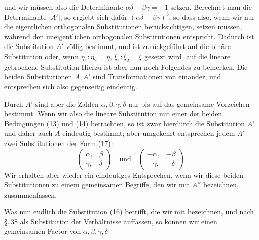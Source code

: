 und wir müssen also die Determinante $\alpha\delta - \beta\gamma = \pm 1$
setzen. Berechnet man die Determinante $|A'|$, so ergiebt sich
dafür $(\alpha\delta - \beta\gamma)^3$, so dass also, wenn wir nur
die eigentlichen orthogonalen Substitutionen berücksichtigen,
setzen müssen, während
den uneigentlichen orthogonalen Substitutionen entspricht.
Dadurch ist die Substitution $A'$ völlig bestimmt, und ist
zurückgeführt auf die binäre Substitution
oder, wenn $\eta_1 : \eta_2 = \eta$, $\xi_1 : \xi_2 = \xi$ gesetzt
wird, auf die lineare gebrochene Substitution
Hierzu ist aber nun noch Folgendes zu bemerken. Die beiden
Substitutionen $A, A'$ sind Transformationen von einander, und
entsprechen sich also gegenseitig eindeutig.

Durch $A'$ sind aber die Zahlen $\alpha, \beta, \gamma, \delta$
nur bis auf das gemeinsame Vorzeichen bestimmt. Wenn wir also die
lineare Substitution
mit einer der beiden Bedingungen (13) und (14) betrachten, so ist
zwar hierdurch die Substitution $A'$ und daher auch $A$ eindeutig
bestimmt; aber umgekehrt entsprechen jedem $A'$ zwei
Substitutionen der Form (17):
\[
\begin{pmatrix} \alpha, & \beta \\ \gamma, & \delta \end{pmatrix}
\quad\text{und}\quad
\begin{pmatrix} -\alpha, & -\beta \\ -\gamma, & -\delta \end{pmatrix}.
\]
Wir erhalten aber wieder ein eindeutiges Entsprechen, wenn wir
diese beiden Substitutionen zu einem gemeinsamen Begriffe, den
wir mit $A''$ bezeichnen, zusammenfassen.

Was nun endlich die Substitution (16) betrifft, die wir mit
bezeichnen, und nach \S.\,38 als Substitution der Verhältnisse
auffassen, so können wir einen gemeinsamen Factor von
$\alpha, \beta, \gamma, \delta$
